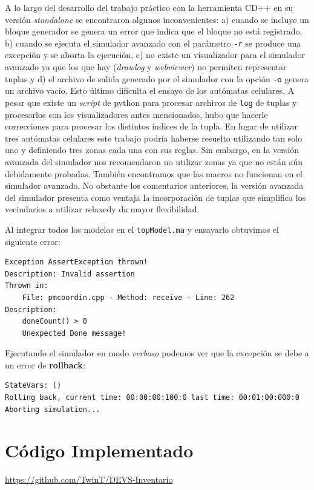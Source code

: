 \documentclass[10pt]{article}
\begin{document}
A lo largo del desarrollo del trabajo práctico con la herramienta CD++ en su versión \textit{standalone} se encontraron algunos inconvenientes: a) cuando se incluye un bloque generador se genera un error que indica que el bloque no está registrado, b) cuando se ejecuta el simulador avanzado con el parámetro \texttt{-r} se produce una excepción y se aborta la ejecución, c) no existe un visualizador para el simulador avanzado ya que los que hay (\textit{drawlog} y \textit{webviewer}) no permiten representar tuplas y d) el archivo de salida generado por el simulador con la opción \texttt{-o} genera un archivo vacío. Esto último dificulta el ensayo de los autómatas celulares. A pesar que existe un \textit{script} de python para procesar archivos de \texttt{log} de tuplas y procesarlos con los visualizadores antes mencionados, hubo que hacerle correcciones para procesar los distintos índices de la tupla. En lugar de utilizar tres autómatas celulares este trabajo podría haberse resuelto utilizando tan solo uno y definiendo tres zonas cada una con sus reglas. Sin embargo, en la versión avanzada del simulador nos recomendaron no utilizar zonas ya que no están aún debidamente probadas. También encontramos que las macros no funcionan en el simulador avanzado. No obstante los comentarios anteriores, la versión avanzada del simulador presenta como ventaja la incorporación de tuplas que simplifica los vecindarios a utilizar relaxedy da mayor flexibilidad.

Al integrar todos los modelos en el \texttt{topModel.ma} y ensayarlo obtuvimos el siguiente error:
\begin{lstlisting}
Exception AssertException thrown!
Description: Invalid assertion
Thrown in: 
	File: pmcoordin.cpp - Method: receive - Line: 262
Description: 
	doneCount() > 0
	Unexpected Done message!
\end{lstlisting}

Ejecutando el simulador en modo \textit{verboso} podemos ver que la excepción se debe a un error de \textbf{rollback}:
\begin{lstlisting}
StateVars: ()
Rolling back, current time: 00:00:00:100:0 last time: 00:01:00:000:0
Aborting simulation...
\end{lstlisting}


\appendix
\section{Código Implementado}

\url{https://github.com/TwinT/DEVS-Inventario}



\end{document}
